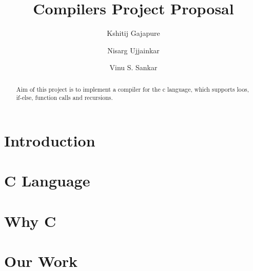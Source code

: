 \documentclass{clv3}
\author{Kshitij Gajapure}
\affil{16110055}
\author{Nisarg Ujjainkar}
\affil{16110102}
\author{Vinu S. Sankar}
\affil{16110xxx}
\title{Compilers Project Proposal}
\begin{document}
    \maketitle  
    \begin{abstract}
        Aim of this project is to implement a compiler for the 
        c language, which supports loos, if-else, function calls 
        and recursions.
    \end{abstract}
    \section{Introduction}
    
    \section{C Language}
    
    \section{Why C}
    
    \section{Our Work}
    
\end{document}
